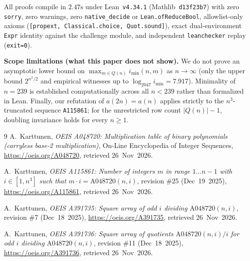 \documentclass[11pt]{article}
\theoremstyle{definition}
\newcommand{\seq}[1]{\texttt{#1}}
\begin{document}
All proofs compile in $2.47\text{s}$ under Lean~\texttt{v4.34.1} (Mathlib~\texttt{d13f23b7}) with zero \texttt{sorry}, zero warnings, zero \texttt{native\_decide} or \texttt{Lean.ofReduceBool}, allowlist-only axioms (\texttt{[propext, Classical.choice, Quot.sound]}), exact dual-environment \texttt{Expr} identity against the challenge module, and independent \texttt{leanchecker} replay (\texttt{exit=0}).

\medskip\noindent\textbf{Scope limitations (what this paper does not show).}
We do not prove an asymptotic lower bound on $\max_{m \in Q(n)} i_{\min}(n, m)$ as $n \to \infty$ (only the upper bound $2^{n^2/2}$ and empirical witnesses up to $\log_{2047} i_{\min} = 7.917$). Minimality of $n = 239$ is established computationally across all $n < 239$ rather than formalized in Lean. Finally, our refutation of $a(2n) = a(n)$ applies strictly to the $n^3$-truncated sequence \seq{A115861}; for the unrestricted row count $|Q(n)| - 1$, doubling invariance holds for every $n \ge 1$.

\begin{thebibliography}{9}
A.~Karttunen, \emph{OEIS A048720: Multiplication table of binary polynomials (carryless base-2 multiplication)}, On-Line Encyclopedia of Integer Sequences, \url{https://oeis.org/A048720}, retrieved 26~Nov~2026.

A.~Karttunen, \emph{OEIS A115861: Number of integers $m$ in range $1 \dots n-1$ with $i \in [1, n^3]$ such that $m \cdot i = \text{A048720}(n, i)$}, revision \#25 (Dec~19~2025), \url{https://oeis.org/A115861}, retrieved 26~Nov~2026.

A.~Karttunen, \emph{OEIS A391735: Square array of odd $i$ dividing $\text{A048720}(n, i)$}, revision \#7 (Dec~18~2025), \url{https://oeis.org/A391735}, retrieved 26~Nov~2026.

A.~Karttunen, \emph{OEIS A391736: Square array of quotients $\text{A048720}(n, i)/i$ for odd $i$ dividing $\text{A048720}(n, i)$}, revision \#11 (Dec~18~2025), \url{https://oeis.org/A391736}, retrieved 26~Nov~2026.
\end{thebibliography}
\end{document}
